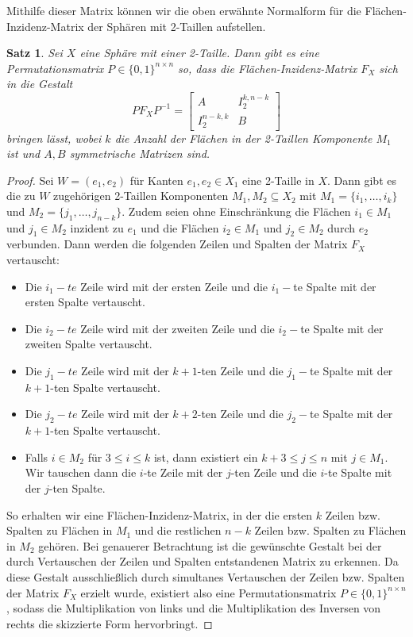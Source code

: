 \documentclass[12pt,titlepage,twoside,cleardoublepage]{article}
\theoremstyle{nummermitklammern}
\newtheorem{satz}[temp]{Satz}
\newtheorem{satz}[zahl]{Satz}
\numberwithin{equation}{section}
\begin{document}
Mithilfe dieser Matrix können wir die oben erwähnte Normalform für die Flächen-Inzidenz-Matrix der Sphären mit 2-Taillen aufstellen.
\begin{satz}\label{mat2w}
Sei $X$ eine Sphäre mit einer 2-Taille. Dann gibt es eine Permutationsmatrix $P\in \{0,1\}^{n\times n}$ so, dass die Flächen-Inzidenz-Matrix $F_X$ sich in die Gestalt 
\[
PF_XP^{-1}=
\left[ 
\begin{array}{c|c} 
  A & I^{k,n-k}_2 \\ 
  \hline 
  I^{n-k,k}_2 & B 
\end{array} 
\right]
\] 
bringen lässt, wobei $k$ die Anzahl der Flächen in der 2-Taillen Komponente $M_1$ ist und $A,B$ symmetrische Matrizen sind.
\end{satz}
\begin{proof}
Sei $W=(e_1,e_2)$ für Kanten $e_1,e_2\in X_1$ eine 2-Taille in $X.$ Dann gibt es die zu $W$ zugehörigen 2-Taillen Komponenten $M_1,M_2\subseteq X_2$ mit $M_1=\{i_1,\ldots,i_k\}$ und $M_2=\{j_1,\ldots,j_{n-k}\}$. Zudem seien ohne Einschränkung die Flächen $i_1\in M_1$ und $j_1\in M_2$ inzident zu $e_1$ und die Flächen $i_2\in M_1$ und $j_2\in M_2$ durch $e_2$ verbunden. Dann werden die folgenden Zeilen und Spalten der Matrix $F_X$ vertauscht:
\begin{itemize}
\item Die $i_1-te$ Zeile wird mit der ersten Zeile und die  $i_1-$te Spalte mit der ersten Spalte vertauscht.
\item Die $i_2-te$ Zeile wird mit der zweiten Zeile und die $i_2-$te Spalte mit der zweiten Spalte vertauscht.
\item Die $j_1-te$ Zeile wird mit der $k+1$-ten Zeile und die $j_1-$te Spalte mit der $k+1$-ten Spalte vertauscht.
\item Die $j_2-te$ Zeile wird mit der $k+2$-ten Zeile und die $j_2-$te Spalte mit der $k+1$-ten Spalte vertauscht.
\item Falls $i\in M_2$ für $3\leq i \leq k$ ist, dann existiert ein $k+3\leq j\leq n$ mit $j \in M_1.$ 
Wir tauschen dann die $i$-te Zeile mit der $j$-ten Zeile und die $i$-te Spalte mit der $j$-ten Spalte.
\end{itemize} 
So erhalten wir eine Flächen-Inzidenz-Matrix, in der die ersten $k$ Zeilen bzw. Spalten zu Flächen in $M_1$ und die restlichen $n-k$ Zeilen bzw. Spalten zu Flächen in $M_2$  gehören. Bei genauerer Betrachtung ist die gewünschte Gestalt  bei der durch Vertauschen der Zeilen und Spalten entstandenen Matrix zu erkennen. Da diese Gestalt ausschließlich durch simultanes Vertauschen der Zeilen bzw. Spalten der Matrix $F_X$ erzielt wurde, existiert also eine Permutationsmatrix $P\in\{0,1\}^{n\times n}$, sodass die Multiplikation von links und die Multiplikation des Inversen von rechts  die skizzierte Form hervorbringt.
\end{proof}
\end{document}
